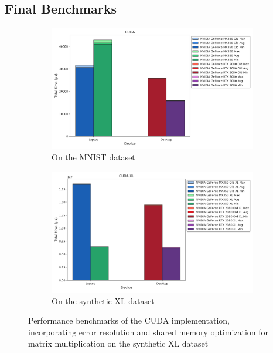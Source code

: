\documentclass[modern,longauthor]{aastex7}
\begin{document}
\subsection{Final Benchmarks}\label{subsec:cuda-final-benchmarks}
\begin{figure}[htb!]
\centering
\begin{subfigure}{.5\textwidth}
  \centering
  \includegraphics[width=\linewidth]{CUDA/CUDA_bugs_fixed.png}
  \caption{On the MNIST dataset}
\end{subfigure}%
\begin{subfigure}{.5\textwidth}
  \centering
  \includegraphics[width=\linewidth]{CUDA/CUDA XL_bugs_fixed.png}
  \caption{On the synthetic XL dataset}
\end{subfigure}
\caption{Performance benchmarks of the CUDA implementation, incorporating error resolution and shared memory optimization for matrix multiplication on the synthetic XL dataset}
\label{fig:cuda-final-bechmarks}
\end{figure}
\end{document}
